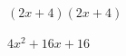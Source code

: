
\question $(2x + 4)(2x + 4)$

  \begin{solutionorlines}[2cm]
    $4x^2 + 16x + 16$
  \end{solutionorlines}
